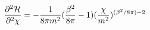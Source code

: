 \begin{equation}
{\partial^2 {\cal{H}} \over \partial^2\chi} = -{1 \over 8 \pi m^2}
({\beta^2 \over 8 \pi}-1) ({\chi \over m^2})^{(\beta^2/ 8 \pi)-2}
\end{equation}

